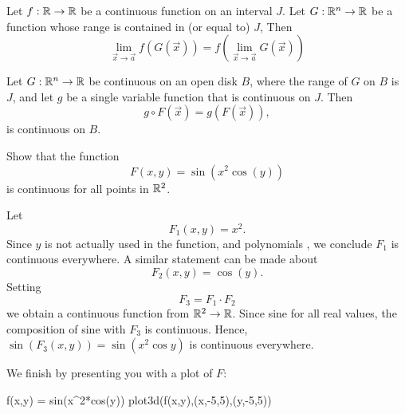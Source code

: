 \documentclass{ximera}
\begin{document}
\begin{theorem}
  Let $f:\mathbb R\to\mathbb R$ be a continuous function on an interval $J$. Let
  $G:\mathbb R^n\to \mathbb R$ be a function whose range is contained in (or equal
  to) $J$, Then
  \[
  \lim_{\vec{x}\to\vec{a}} f( G(\vec{x})) = f(\lim_{\vec{x}\to\vec{a}}G(\vec{x}))
  \]
\end{theorem}


\begin{corollary}
  Let $G:\mathbb R^n\to \mathbb R$ be continuous on an open disk $B$, where the
  range of $G$ on $B$ is $J$, and let $g$ be a single variable
  function that is continuous on $J$. Then
  \[
  g\circ F(\vec{x}) =g(F(\vec{x})),
  \]
  is continuous on $B$.
\end{corollary}



\begin{example}
  Show that the function
  \[
  F(x,y) = \sin(x^2\cos(y))
  \]
  is continuous for all points in $\mathbb R^2$.
  \begin{explanation}
    Let
    \[
    F_1(x,y) = x^2.
    \]
    Since $y$ is not actually used in the function, and polynomials
    , we conclude $F_1$ is continuous everywhere. A
    similar statement can be made about
    \[
    F_2(x,y) = \cos(y).
    \]
    Setting
    \[
    F_3=F_1\cdot F_2
    \]
    we obtain a continuous function from $\mathbb R^2\to \mathbb R$. Since sine  for all real values, the composition of sine with $F_3$
    is continuous. Hence, $\sin (F_3(x,y)) = \sin(x^2\cos y)$ is
    continuous everywhere.
    \begin{onlineOnly}
      We finish by presenting you with a plot of $F$:
\begin{sageCell}
f(x,y) = sin(x^2*cos(y))
plot3d(f(x,y),(x,-5,5),(y,-5,5))
\end{sageCell}
    \end{onlineOnly}
  \end{explanation}
\end{example}
\end{document}
